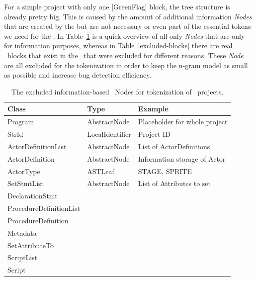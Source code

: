For a simple \scratch{} project with only one [GreenFlag] block, the tree structure is already pretty big. This is caused by the amount of additional information \textit{Nodes} that are created by the \litterbox{} \AST{} but are not necessary or even part of the essential tokens we need for the \ngram{}. In Table~\ref{tab:excluded-metadata} is a quick overview of all \AST\-only \textit{Nodes} that are only for information purposes, whereas in Table~\ref{excluded-blocks} there are real \scratch\ blocks that exist in the \AST\ that were excluded for different reasons. These \textit{Node} are all excluded for the tokenization in order to keep the n-gram model as small as possible and increase bug detection efficiency.   

\begin{table}[H]
    \caption[The excluded information-based \AST\ Nodes]{\label{tab:excluded-metadata}The excluded information-based \AST\ Nodes for tokenization of \scratch\ projects.}

    \begin{tabular}[t]{lll}
    	\toprule
    	Class & Type & Example \\
    	\midrule
    	\vspace{10pt}
        Program & AbstractNode & Placeholder for whole project\\
        \vspace{10pt}
        StrId & LocalIdentifier & Project ID \\
        \vspace{10pt}
        ActorDefinitionList & AbstractNode & List of ActorDefinitions \\
        \vspace{10pt}   
        ActorDefinition & AbstractNode & Information storage of Actor \\
        \vspace{10pt}
        ActorType & ASTLeaf & STAGE, SPRITE \\  
        \vspace{10pt} 
        SetStmtList & AbstractNode & List of Attributes to set \\
        \vspace{10pt}
        DeclarationStmt &  & \\
        \vspace{10pt}
        ProcedureDefinitionList & & \\
        \vspace{10pt}
        ProcedureDefinition & & \\
        \vspace{10pt}
        Metadata & &  \\
        \vspace{10pt}
        SetAttributeTo & &  \\
        \vspace{10pt}
        ScriptList & &  \\
        \vspace{10pt}
        Script & &  \\              
       

        \bottomrule
    \end{tabular}
\end{table}

